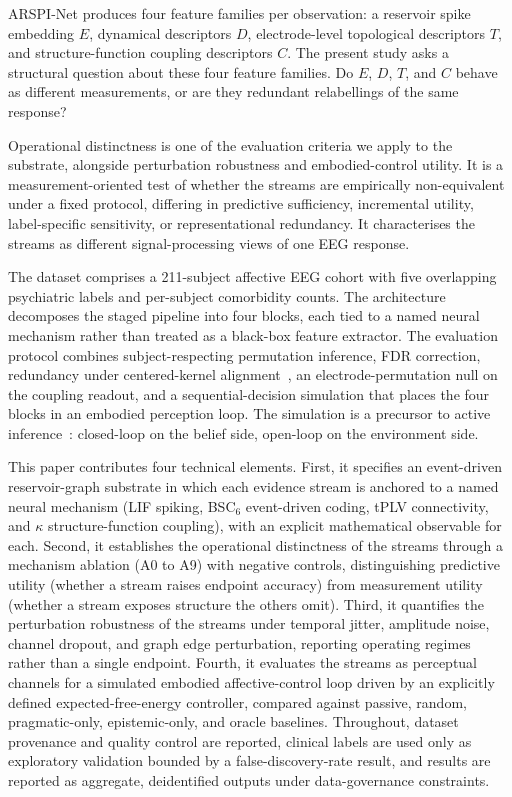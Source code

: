 \documentclass[journal]{IEEEtran}
\begin{document}
ARSPI-Net produces four feature families per observation: a reservoir spike embedding $E$, dynamical descriptors $D$, electrode-level topological descriptors $T$, and structure-function coupling descriptors $C$. The present study asks a structural question about these four feature families. Do $E$, $D$, $T$, and $C$ behave as different measurements, or are they redundant relabellings of the same response?

Operational distinctness is one of the evaluation criteria we apply to the substrate, alongside perturbation robustness and embodied-control utility. It is a measurement-oriented test of whether the streams are empirically non-equivalent under a fixed protocol, differing in predictive sufficiency, incremental utility, label-specific sensitivity, or representational redundancy. It characterises the streams as different signal-processing views of one EEG response.

The dataset comprises a 211-subject affective EEG cohort with five overlapping psychiatric labels and per-subject comorbidity counts. The architecture decomposes the staged pipeline into four blocks, each tied to a named neural mechanism rather than treated as a black-box feature extractor. The evaluation protocol combines subject-respecting permutation inference, FDR correction, redundancy under centered-kernel alignment~\cite{kornblith2019similarity}, an electrode-permutation null on the coupling readout, and a sequential-decision simulation that places the four blocks in an embodied perception loop. The simulation is a precursor to active inference~\cite{friston2010free,parr2022activeinference,pezzulo2015active}: closed-loop on the belief side, open-loop on the environment side.

This paper contributes four technical elements. First, it specifies an event-driven reservoir-graph substrate in which each evidence stream is anchored to a named neural mechanism (LIF spiking, BSC$_6$ event-driven coding, tPLV connectivity, and $\kappa$ structure-function coupling), with an explicit mathematical observable for each. Second, it establishes the operational distinctness of the streams through a mechanism ablation (A0 to A9) with negative controls, distinguishing predictive utility (whether a stream raises endpoint accuracy) from measurement utility (whether a stream exposes structure the others omit). Third, it quantifies the perturbation robustness of the streams under temporal jitter, amplitude noise, channel dropout, and graph edge perturbation, reporting operating regimes rather than a single endpoint. Fourth, it evaluates the streams as perceptual channels for a simulated embodied affective-control loop driven by an explicitly defined expected-free-energy controller, compared against passive, random, pragmatic-only, epistemic-only, and oracle baselines. Throughout, dataset provenance and quality control are reported, clinical labels are used only as exploratory validation bounded by a false-discovery-rate result, and results are reported as aggregate, deidentified outputs under data-governance constraints.
\end{document}
